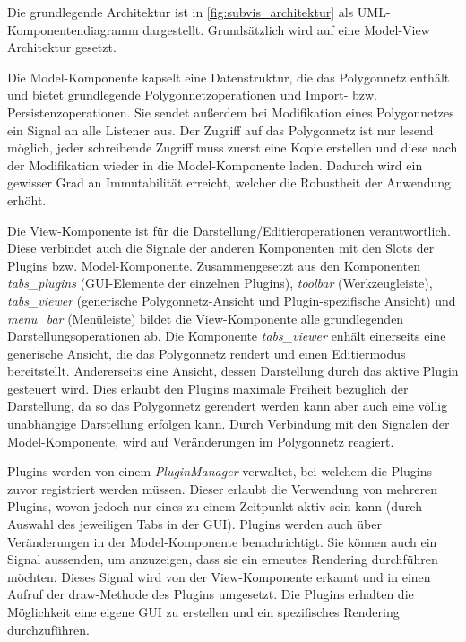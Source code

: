 Die grundlegende Architektur ist in \autoref{fig:subvis_architektur} als UML-Komponentendiagramm dargestellt. 
Grundsätzlich wird auf eine Model-View Architektur gesetzt.

Die Model-Komponente kapselt eine Datenstruktur, die das Polygonnetz enthält und bietet grundlegende Polygonnetzoperationen und Import- bzw. Persistenzoperationen.
Sie sendet außerdem bei Modifikation eines Polygonnetzes ein Signal an alle Listener aus.
Der Zugriff auf das Polygonnetz ist nur lesend möglich, jeder schreibende Zugriff muss zuerst eine Kopie erstellen und diese nach der Modifikation wieder in die Model-Komponente laden.
Dadurch wird ein gewisser Grad an Immutabilität erreicht, welcher die Robustheit der Anwendung erhöht.

Die View-Komponente ist für die Darstellung/Editieroperationen verantwortlich.
Diese verbindet auch die Signale der anderen Komponenten mit den Slots der Plugins bzw. Model-Komponente.
Zusammengesetzt aus den Komponenten \emph{tabs\_plugins} (GUI-Elemente der einzelnen Plugins), \emph{toolbar} (Werkzeugleiste), \emph{tabs\_viewer} (generische Polygonnetz-Ansicht und Plugin-spezifische Ansicht) und \emph{menu\_bar} (Menüleiste) bildet die View-Komponente alle grundlegenden Darstellungsoperationen ab.
Die Komponente \emph{tabs\_viewer} enhält einerseits eine generische Ansicht, die das Polygonnetz rendert und einen Editiermodus bereitstellt. 
Andererseits eine Ansicht, dessen Darstellung durch das aktive Plugin gesteuert wird.
Dies erlaubt den Plugins maximale Freiheit bezüglich der Darstellung, da so das Polygonnetz gerendert werden kann aber auch eine völlig unabhängige Darstellung erfolgen kann.
Durch Verbindung mit den Signalen der Model-Komponente, wird auf Veränderungen im Polygonnetz reagiert.

Plugins werden von einem \emph{PluginManager} verwaltet, bei welchem die Plugins zuvor registriert werden müssen.
Dieser erlaubt die Verwendung von mehreren Plugins, wovon jedoch nur eines zu einem Zeitpunkt aktiv sein kann (durch Auswahl des jeweiligen Tabs in der GUI).
Plugins werden auch über Veränderungen in der Model-Komponente benachrichtigt.
Sie können auch ein Signal aussenden, um anzuzeigen, dass sie ein erneutes Rendering durchführen möchten.
Dieses Signal wird von der View-Komponente erkannt und in einen Aufruf der draw-Methode des Plugins umgesetzt.
Die Plugins erhalten die Möglichkeit eine eigene GUI zu erstellen und ein spezifisches Rendering durchzuführen.

